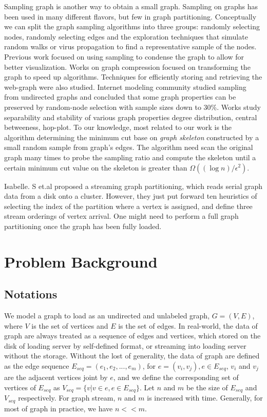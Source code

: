 \documentclass{sig-alternate-2013}
\begin{document}
Sampling graph is another way to obtain a small graph. Sampling on graphs has been used in many different flavors, but few in graph partitioning. Conceptually we can split the graph sampling algorithms into three groups: randomly selecting nodes, randomly selecting edges and the exploration techniques that simulate random walks or virus propagation to find a representative sample of the nodes\cite{DBLP:conf/kdd/LeskovecF06}. Previous work focused on using sampling to condense the graph to allow for better visualization. Works on graph compression focused on transforming the graph to speed up algorithms. Techniques for efficiently storing and retrieving the web-graph were also studied. Internet modeling community studied sampling from undirected graphs and concluded that some graph properties can be preserved by random-node selection with sample sizes down to 30\%.  Works study separability and stability of various graph properties degree distribution, central betweeness, hop-plot\cite{DBLP:conf/kdd/LeskovecF06}. To our knowledge, most related to our work is the algorithm determining the minimum cut base on \emph{graph skeleton} constructed by a small random sample from graph's edges\cite{Karger:mincut}. The algorithm need scan the original graph many times to probe the sampling ratio and compute the skeleton until a certain minimum cut value on the skeleton is greater than $\Omega((\log n)/\epsilon^2)$.

Isabelle. S et.al\cite{Stanton:streampartition} proposed a streaming graph partitioning, which reads serial graph data from a disk onto a cluster. However, they just put forward ten heuristics of selecting the index of the partition where a vertex is assigned, and define three stream orderings of vertex arrival. One might need to perform a full graph partitioning once the graph has been fully loaded.

\section{Problem Background}\label{section-background}
\subsection{Notations}

We model a graph to load as an undirected and unlabeled graph,  $G=(V,E)$, where $V$ is the set of vertices and $E$ is the set of edges. In real-world, the data of graph are always treated as a sequence of edges and vertices, which stored on the disk of loading server by self-defined format, or streaming into loading server without the storage. Without the lost of generality, the data of graph are defined as the edge sequence $E_{seq}=(e_1,e_2,...,e_m)$, for $e=(v_i, v_j), e \in E_{seq}$, $v_i$ and $v_j$ are the adjacent vertices joint by $e$, and we define the corresponding set of vertices of $E_{seq}$ as $V_{seq} = \{v | v\in e , e\in E_{seq}\}$. Let $n$ and $m$ be the size of $E_{seq}$ and $V_{seq}$ respectively. For graph stream, $n$ and $m$ is increased with time. Generally, for most of graph in practice, we have $n<<m$.
\end{document}
